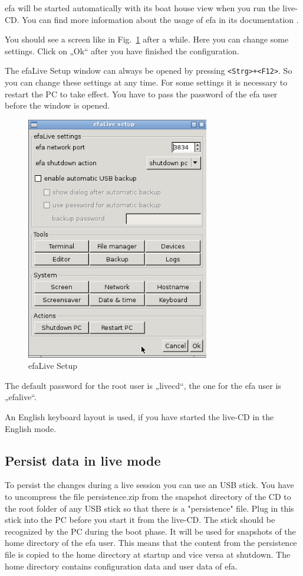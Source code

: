 \documentclass[a4paper,12pt,twoside]{article}
\begin{document}
efa will be started automatically with its boat house view when you run
the live-CD. You can find more information about the usage of efa in
its documentation \cite{EFA2}.

You should see a screen like in Fig.~\ref{fig:efalivesetup_live} after a while.
Here you can change some settings. Click on „Ok“ after you have finished the 
configuration.

The efaLive Setup window can always be opened by pressing
\texttt{{\textless}Strg{\textgreater}+{\textless}F12{\textgreater}}. So you can
change these settings at any time. For some settings it is necessary to
restart the PC to take effect. You have to pass the password of the efa
user before the window is opened.

\begin{figure}
    \centering
    \includegraphics[width=8cm]{efaLiveen-img/efaLive_efaLiveSetup_en.png}
    \caption{efaLive Setup}
    \label{fig:efalivesetup_live}
\end{figure}

The default password for the root user is „livecd“, the one for the efa
user is „efalive“.

An English keyboard layout is used, if you have started the live-CD in
the English mode.


\subsection{Persist data in live mode}
\label{sct:live_persist}
To persist the changes during a live session you can use an USB stick.
You have to uncompress the file persistence.zip from the snapshot
directory of the CD to the root folder of any USB stick so that there
is a "persistence" file. Plug in this stick
into the PC before you start it from the live-CD. The stick should be
recognized by the PC during the boot phase. It will be used for
snapshots of the home directory of the efa user. This means that the
content from the persistence file is copied to the home directory at
startup and vice versa at shutdown. The home directory contains
configuration data and user data of efa.
\end{document}
